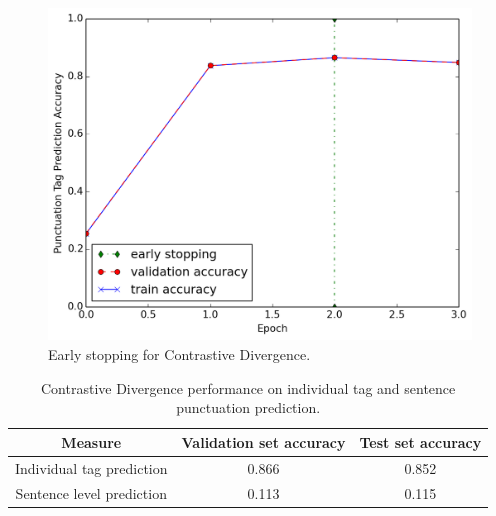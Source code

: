 \documentclass[twoside,12pt]{article}
\begin{document}
\begin{figure}[H]
\centering
\includegraphics[width=1.\textwidth]{./figs/Gibbs/CD.png}
\caption{Early stopping for Contrastive Divergence.}
\label{figCDEarlyStopping}
\end{figure}


\begin{table}[H]\footnotesize
  \caption{Contrastive Divergence performance on individual tag and sentence punctuation prediction.}
\begin{center}
    \begin{tabular}{| c | c | c | }
    \hline
    \textbf{ Measure} & \textbf{Validation set accuracy} & \textbf{Test set accuracy} \\ \hline
    Individual tag prediction & 0.866 & 0.852  \\ \hline
    Sentence level prediction & 0.113 & 0.115  \\ \hline
    \end{tabular}
    \label{tablePredGibbs}
\end{center}
\end{table}
\end{document}
